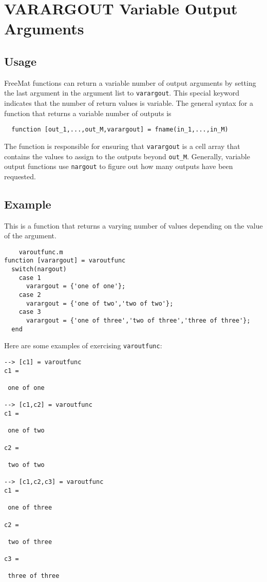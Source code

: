\section{VARARGOUT Variable Output Arguments}

\subsection{Usage}

FreeMat functions can return a variable number of output arguments
by setting the last argument in the argument list to \verb|varargout|.
This special keyword indicates that the number of return values
is variable.  The general syntax for a function that returns
a variable number of outputs is
\begin{verbatim}
  function [out_1,...,out_M,varargout] = fname(in_1,...,in_M)
\end{verbatim}
The function is responsible for ensuring that \verb|varargout| is
a cell array that contains the values to assign to the outputs
beyond \verb|out_M|.  Generally, variable output functions use
\verb|nargout| to figure out how many outputs have been requested.
\subsection{Example}

This is a function that returns a varying number of values
depending on the value of the argument.
\begin{verbatim}
    varoutfunc.m
function [varargout] = varoutfunc
  switch(nargout)
    case 1
      varargout = {'one of one'};
    case 2
      varargout = {'one of two','two of two'};
    case 3
      varargout = {'one of three','two of three','three of three'};
  end
\end{verbatim}
Here are some examples of exercising \verb|varoutfunc|:
\begin{verbatim}
--> [c1] = varoutfunc
c1 = 

 one of one

--> [c1,c2] = varoutfunc
c1 = 

 one of two

c2 = 

 two of two

--> [c1,c2,c3] = varoutfunc
c1 = 

 one of three

c2 = 

 two of three

c3 = 

 three of three
\end{verbatim}
